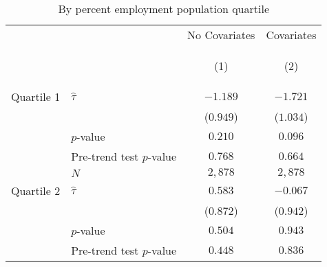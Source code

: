 \begin{table}[tbh]
        \caption{By percent employment population quartile}
        \label{tab:by_percent_employment_population_quartile}
        \centering
        \vspace{1em}
        \begin{tabular}{llcc}
\toprule
                    &     &                                                        No Covariates &                                                           Covariates \\
                    &     & \hypertarget{tabcol:by_percent_employment_population_quartile1}{(1)} & \hypertarget{tabcol:by_percent_employment_population_quartile2}{(2)} \\
\midrule
\midrule Quartile 1 & $\hat \tau$ &                                                             $-1.189$ &                                                             $-1.721$ \\
                    &     &                                                            ($0.949$) &                                                            ($1.034$) \\
                    & $p$-value &                                                              $0.210$ &                                                              $0.096$ \\
                    & Pre-trend test $p$-value &                                                              $0.768$ &                                                              $0.664$ \\
                    & $N$ &                                                              $2,878$ &                                                              $2,878$ \\
\midrule Quartile 2 & $\hat \tau$ &                                                              $0.583$ &                                                             $-0.067$ \\
                    &     &                                                            ($0.872$) &                                                            ($0.942$) \\
                    & $p$-value &                                                              $0.504$ &                                                              $0.943$ \\
                    & Pre-trend test $p$-value &                                                              $0.448$ &                                                              $0.836$ \\

\end{tabular}
\end{table}
